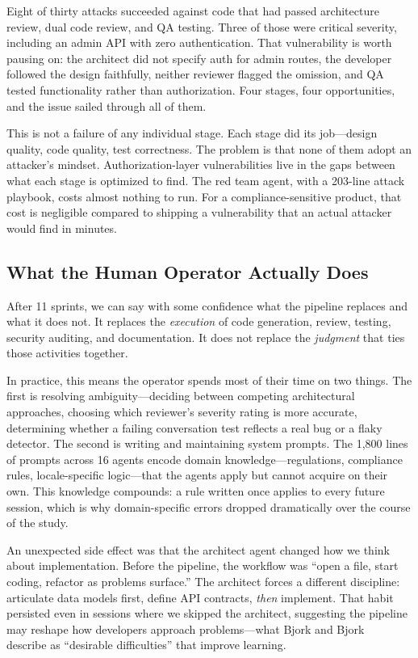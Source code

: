\documentclass[11pt,a4paper]{article}
\begin{document}
Eight of thirty attacks succeeded against code that had passed architecture review, dual code review, and QA testing. Three of those were critical severity, including an admin API with zero authentication. That vulnerability is worth pausing on: the architect did not specify auth for admin routes, the developer followed the design faithfully, neither reviewer flagged the omission, and QA tested functionality rather than authorization. Four stages, four opportunities, and the issue sailed through all of them.

This is not a failure of any individual stage. Each stage did its job---design quality, code quality, test correctness. The problem is that none of them adopt an attacker's mindset. Authorization-layer vulnerabilities live in the gaps between what each stage is optimized to find. The red team agent, with a 203-line attack playbook, costs almost nothing to run. For a compliance-sensitive product, that cost is negligible compared to shipping a vulnerability that an actual attacker would find in minutes.

\subsection{What the Human Operator Actually Does}

After 11 sprints, we can say with some confidence what the pipeline replaces and what it does not. It replaces the \textit{execution} of code generation, review, testing, security auditing, and documentation. It does not replace the \textit{judgment} that ties those activities together.

In practice, this means the operator spends most of their time on two things. The first is resolving ambiguity---deciding between competing architectural approaches, choosing which reviewer's severity rating is more accurate, determining whether a failing conversation test reflects a real bug or a flaky detector. The second is writing and maintaining system prompts. The 1,800 lines of prompts across 16 agents encode domain knowledge---regulations, compliance rules, locale-specific logic---that the agents apply but cannot acquire on their own. This knowledge compounds: a rule written once applies to every future session, which is why domain-specific errors dropped dramatically over the course of the study.

An unexpected side effect was that the architect agent changed how we think about implementation. Before the pipeline, the workflow was ``open a file, start coding, refactor as problems surface.'' The architect forces a different discipline: articulate data models first, define API contracts, \textit{then} implement. That habit persisted even in sessions where we skipped the architect, suggesting the pipeline may reshape how developers approach problems---what Bjork and Bjork~\cite{bjork2011} describe as ``desirable difficulties'' that improve learning.
\end{document}
